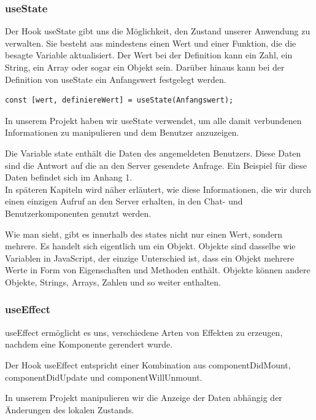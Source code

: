 \subsubsection{useState}
Der Hook useState gibt uns die Möglichkeit, den Zustand unserer Anwendung zu verwalten. Sie besteht aus mindestens einen Wert und einer Funktion, die die besagte Variable aktualisiert.
Der Wert bei der Definition kann ein Zahl, ein String, ein Array oder sogar ein Objekt sein.
Darüber hinaus kann bei der Definition von useState ein Anfangswert festgelegt werden.

\begin{lstlisting}
const [wert, definiereWert] = useState(Anfangswert);
\end{lstlisting}

In unserem Projekt haben wir useState verwendet, um alle damit verbundenen Informationen zu manipulieren und dem Benutzer anzuzeigen.

Die Variable state enthält die Daten des angemeldeten Benutzers.
Diese Daten sind die Antwort auf die an den Server gesendete Anfrage.
Ein Beispiel für diese Daten befindet sich im Anhang 1.
\\
In späteren Kapiteln wird näher erläutert, wie diese Informationen, die wir durch einen einzigen Aufruf an den Server erhalten, in den Chat- und Benutzerkomponenten genutzt werden.

Wie man sieht, gibt es innerhalb des states nicht nur einen Wert, sondern mehrere.
Es handelt sich eigentlich um ein Objekt. Objekte sind dasselbe wie Variablen in JavaScript, der einzige Unterschied ist, dass ein Objekt mehrere Werte in Form von Eigenschaften und Methoden enthält.
Objekte können andere Objekte, Strings, Arrays, Zahlen und so weiter enthalten.
\newpage

\subsubsection{useEffect}
useEffect ermöglicht es uns, verschiedene Arten von Effekten zu erzeugen, nachdem eine Komponente gerendert wurde.
\\
\begin{flushleft}
  Der Hook useEffect entspricht einer Kombination aus componentDidMount, componentDidUpdate und componentWillUnmount.

  In unserem Projekt manipulieren wir die Anzeige der Daten abhängig der Änderungen des lokalen Zustands.
\end{flushleft}

